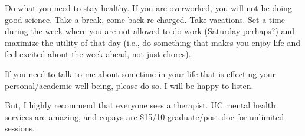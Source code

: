 \documentclass[12pt]{article}
\begin{document}
Do what you need to stay healthy. If you are overworked, you will not
be doing good science. Take a break, come back re-charged. Take
vacations. Set a time during the week where you are not allowed to do
work (Saturday perhaps?) and maximize the utility of that day (i.e.,
do something that makes you enjoy life and feel excited about the week
ahead, not just chores).

If you need to talk to me about sometime in your life that is effecting
your personal/academic well-being, please do so. I will be happy to
listen. 

But, I highly recommend that everyone sees a therapist. UC mental
health services are amazing, and copays are \$15/10 graduate/post-doc
for unlimited sessions.
\end{document}
